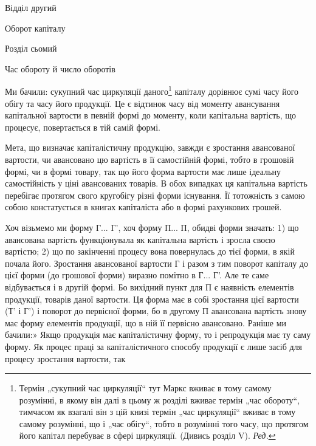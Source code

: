 Відділ другий

Оборот капіталу

Розділ сьомий

Час обороту й число оборотів

Ми бачили: сукупний час циркуляції даного\footnote*{
Термін „сукупний час циркуляції“ тут Маркс вживає в тому самому розумінні,
в якому він далі в цьому ж розділі вживає термін „час обороту“, тимчасом
як взагалі він з цій книзі термін „час циркуляції“ вживає в тому самому
розумінні, що і „час обігу“, тобто в розумінні того часу, що протягом його капітал
перебуває в сфері циркуляції. (Дивись розділ V). \emph{Ред.}
} капіталу дорівнює сумі
часу його обігу та часу його продукції. Це є відтинок часу від моменту
авансування капітальної вартости в певній формі до моменту, коли капітальна
вартість, що процесує, повертається в тій самій формі.

Мета, що визначає капіталістичну продукцію, завжди є зростання
авансованої вартости, чи авансовано цю вартість в її самостійній формі,
тобто в грошовій формі, чи в формі товару, так що його форма вартости
має лише ідеальну самостійність у ціні авансованих товарів.
В обох випадках ця капітальна вартість перебігає протягом свого кругобігу
різні форми існування. Її тотожність з самою собою констатується
в книгах капіталіста або в формі рахункових грошей.

Хоч візьмемо ми форму Г... Г', хоч форму П... П, обидві форми
значать: 1) що авансована вартість функціонувала як капітальна вартість
і зросла своєю вартістю; 2) що по закінченні процесу вона повернулась
до тієї форми, в якій почала його. Зростання авансованої вартости Г і
разом з тим поворот капіталу до цієї форми (до грошової форми) виразно
помітно в Г... Г'. Але те саме відбувається і в другій формі. Бо
вихідний пункт для П є наявність елементів продукції, товарів даної
вартости. Ця форма має в собі зростання цієї вартости (Т' і Г') і поворот
до первісної форми, бо в другому П авансована вартість
знову має форму елементів продукції, що в ній її первісно авансовано.
Раніше ми бачили:» Якщо продукція має капіталістичну форму, то
і репродукція має ту саму форму. Як процес праці за капіталістичного
способу продукції є лише засіб для процесу зростання вартости, так
\parbreak{}  %
